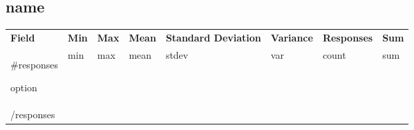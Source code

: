\subsection{ {{{name}}} }
\renewcommand{\tabularxcolumn}[1]{>{\centering\arraybackslash}m{#1}}
\footnotesize
\begin{xltabular}{\linewidth}{AXXXBCDX}
		\bfseries\color{white} Field &
		\bfseries\color{white} Min &
		\bfseries\color{white} Max &
		\bfseries\color{white} Mean &
		\bfseries\color{white} Standard Deviation &
		\bfseries\color{white} Variance &
		\bfseries\color{white} Responses &
		\bfseries\color{white} Sum \\
	{{#responses}}
	\raggedright{ {{{option}}} } & {{min}} & {{max}} & {{mean}} & {{stdev}} & {{var}} & {{count}} & {{sum}} \\
	{{/responses}}
\end{xltabular}
\normalsize
\tagstructend